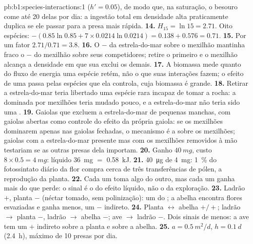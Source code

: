 \begin{solution}{pb:b1:species-interactions:1}
($h' = 0.05$), de modo que, na saturação, o besouro come até 20 delas
por dia: a ingestão total em densidade alta praticamente duplica se
ele passar para a presa mais rápida.
\textbf{14.} $H_{15} = \ln 15 = 2.71$. Oito espécies: $-(0.85\ln 0.85
+ 7\times 0.0214\ln 0.0214) = 0.138 + 0.576 = 0.71$.
\textbf{15.} Por um fator $2.71/0.71 = 3.8$.
\textbf{16.} O $-$ da estrela-do-mar sobre o mexilhão mantinha fraco o
$-$ do mexilhão sobre seus competidores; retire o primeiro e o
mexilhão alcança a densidade em que sua  exclui os demais.
\textbf{17.} A biomassa mede quanto do fluxo de energia uma espécie
retém, não o que suas interações fazem; o efeito de uma 
passa pelas espécies que ela controla, cuja biomassa é grande.
\textbf{18.} Retirar a estrela-do-mar teria libertado uma espécie rara
incapaz de tomar a rocha: a  dominada por mexilhões teria
mudado pouco, e a estrela-do-mar não teria sido uma .
\textbf{19.} Gaiolas que excluem a estrela-do-mar de pequenas manchas,
com gaiolas abertas como controle do efeito da própria gaiola: se os
mexilhões dominarem apenas nas gaiolas fechadas, o mecanismo é a
 sobre os mexilhões; gaiolas com a estrela-do-mar presente mas
com os mexilhões removidos à mão testariam se as outras presas dela
importam.
\textbf{20.} Ganho $\qty{40}{mg}$, custo $8\times 0.5 = \qty{4}{mg}$:
líquido \qty{36}{mg} $=$ \qty{0.58}{kJ}.
\textbf{21.} \qty{40}{\micro g} de \qty{4}{mg}: \qty{1}{\%} do
fotossintato diário da flor compra cerca de três transferências de
pólen, a reprodução da planta.
\textbf{22.} Cada um toma algo do outro, mas cada um ganha mais do que
perde: o sinal é o do efeito líquido, não o da exploração.
\textbf{23.} Ladrão $+$, planta $-$ (néctar tomado, sem polinização):
um  do ; a abelha encontra flores esvaziadas e
ganha menos, um $-$ indireto.
\textbf{24.} Planta $\leftrightarrow$ abelha $+/+$; ladrão $\to$ planta
$-$, ladrão $\to$ abelha $-$; ave $\to$ ladrão $-$. Dois sinais de
menos: a ave tem um $+$ indireto sobre a planta e sobre a abelha.
\textbf{25.} $a = \qty{0.5}{m^2/d}$, $h = \qty{0.1}{d}$ (\qty{2.4}{h}),
máximo de \num{10} presas por dia.
\end{solution}
